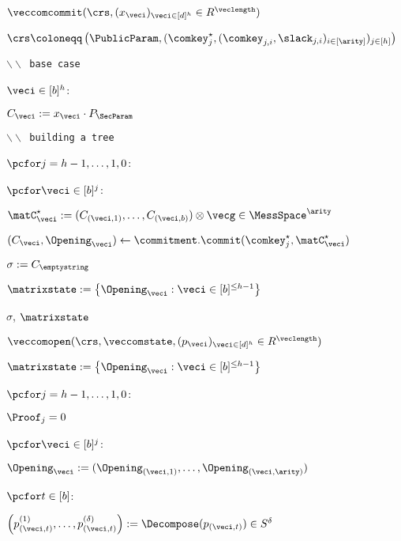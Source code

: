 \begin{figure}[t]
{{\begin{minipage}[t]{0.50\textwidth}
					\underline{$\veccomcommit(\crs, (x_{\veci})_{\veci \in [d]^h} \in R^{\veclength})$}
					\begin{algorithmic}[1]
						\item $\crs \coloneqq \left(\PublicParam, (\comkey^\star_j,(\comkey_{j,i},\slack_{j,i})_{i\in [\arity]})_{j \in [h]} \right)$
						\item \texttt{$\backslash \backslash$ base case}
						\item \pcfor $\veci \in [b]^h$:
						\item \quad $C_{\veci} := x_{\veci} \cdot P_\SecParam$
						\item \texttt{$\backslash \backslash$ building a tree}
						\item $\pcfor j = h-1,\ldots,1,0$:
						\item \quad $\pcfor \veci \in [b]^j$:
						\item \quad \quad $\matC^\star_\veci := (C_{(\veci,1)},\ldots,C_{(\veci,b)}) \otimes \vecg  \in \MessSpace^{\arity}$
						\item \quad \quad $(C_\veci, \Opening_\veci) \gets \commitment.\commit(\comkey^\star_j,\matC^\star_\veci)$
						\item $\sigma := C_{\emptystring}$
						\item $\matrixstate := \left\{ \Opening_{\veci} : \veci \in [b]^{\leq h-1}\right\}$
						\item \Return $\sigma$, $\matrixstate$
					\end{algorithmic}
				\end{minipage}
				\begin{minipage}[t]{0.55\textwidth}
					\underline{$\veccomopen(\crs, \veccomstate, (p_{\veci})_{\veci \in [d]^h} \in R^{\veclength})$}
					\begin{algorithmic}[1]
						\item $\matrixstate := \left\{ \Opening_{\veci} : \veci \in [b]^{\leq h-1}\right\}$
						\item $\pcfor j = h-1,\ldots,1,0$:
						\item \quad $\Proof_j = 0$
						\item \quad $\pcfor \veci \in [b]^j$:
						\item \quad \quad $\Opening_\veci := (\Opening_{(\veci,1)},\ldots,\Opening_{(\veci,\arity)})$
						\item \quad \quad $\pcfor t \in [b]$:
						\item \quad \quad \quad  $\left(p^{(1)}_{(\veci,t)}, \ldots,  p^{(\delta)}_{(\veci,t)}\right) := \Decompose(p_{(\veci,t)}) \in S^{\delta}$

\end{algorithmic}
\end{minipage}}}
\end{figure}

